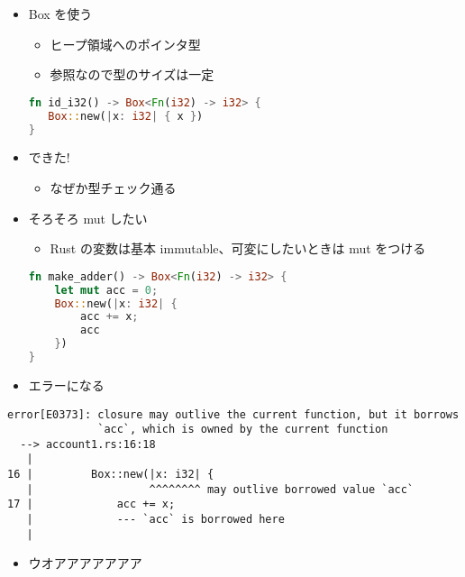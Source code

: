 \documentclass[dvipdfmx,11pt]{beamer}
\begin{document}
\begin{frame}[fragile]
  \begin{itemize}
  \item Box を使う
    \begin{itemize}
    \item ヒープ領域へのポインタ型
    \item 参照なので型のサイズは一定
    \end{itemize}
    \begin{lstlisting}[language={Rust}]
fn id_i32() -> Box<Fn(i32) -> i32> {
   Box::new(|x: i32| { x })
}
    \end{lstlisting}
  \item できた!
    \begin{itemize}
    \item なぜか型チェック通る
    \end{itemize}
  \end{itemize}
\end{frame}

\begin{frame}[fragile]
  \begin{itemize}
  \item そろそろ mut したい
    \begin{itemize}
      \item Rust の変数は基本 immutable、可変にしたいときは mut をつける
    \end{itemize}
    \begin{lstlisting}[language={Rust}]
fn make_adder() -> Box<Fn(i32) -> i32> {
    let mut acc = 0;
    Box::new(|x: i32| {
        acc += x;
        acc
    })
}
    \end{lstlisting}
  \end{itemize}
\end{frame}

\begin{frame}[fragile]
  \begin{itemize}
  \item エラーになる
  \end{itemize}
  \begin{Verbatim}[fontsize=\scriptsize]
error[E0373]: closure may outlive the current function, but it borrows
              `acc`, which is owned by the current function
  --> account1.rs:16:18
   |
16 |         Box::new(|x: i32| {
   |                  ^^^^^^^^ may outlive borrowed value `acc`
17 |             acc += x;
   |             --- `acc` is borrowed here
   |
  \end{Verbatim}
  \begin{itemize}
  \item ウオアアアアアアア
  \end{itemize}
\end{frame}
\end{document}
